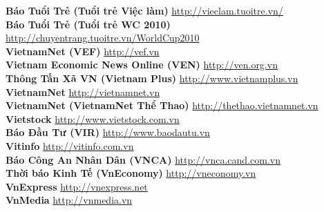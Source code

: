 \textbf{Báo Tuổi Trẻ (Tuổi trẻ Việc làm)} \hspace{0.5in} \href{http://vieclam.tuoitre.vn/}{http://vieclam.tuoitre.vn/} \\ 
\textbf{Báo Tuổi Trẻ (Tuổi trẻ WC 2010)} \hspace{0.5in} \href{http://chuyentrang.tuoitre.vn/WorldCup2010}{http://chuyentrang.tuoitre.vn/WorldCup2010} \\ 
\textbf{VietnamNet (VEF)}  \hspace{0.5in} \href{http://vef.vn}{http://vef.vn} \\ 
\textbf{Vietnam Economic News Online (VEN)}  \hspace{0.5in} \href{http://ven.org.vn}{http://ven.org.vn} \\ 
\textbf{Thông Tấn Xã VN (Vietnam Plus)}  \hspace{0.5in} \href{http://www.vietnamplus.vn}{http://www.vietnamplus.vn} \\ 
\textbf{VietnamNet}  \hspace{0.5in} \href{http://vietnamnet.vn}{http://vietnamnet.vn} \\ 
\textbf{VietnamNet (VietnamNet Thể Thao)} \hspace{0.5in} \href{http://thethao.vietnamnet.vn}{http://thethao.vietnamnet.vn} \\ 
\textbf{Vietstock}  \hspace{0.5in} \href{http://www.vietstock.com.vn}{http://www.vietstock.com.vn} \\ 
\textbf{Báo Đầu Tư (VIR)}  \hspace{0.5in} \href{http://www.baodautu.vn}{http://www.baodautu.vn} \\ 
\textbf{Vitinfo}  \hspace{0.5in} \href{http://vitinfo.com.vn}{http://vitinfo.com.vn} \\ 
\textbf{Báo Công An Nhân Dân (VNCA)}  \hspace{0.5in} \href{http://vnca.cand.com.vn}{http://vnca.cand.com.vn} \\ 
\textbf{Thời báo Kinh Tế (VnEconomy)}  \hspace{0.5in} \href{http://vneconomy.vn}{http://vneconomy.vn} \\ 
\textbf{VnExpress}  \hspace{0.5in} \href{http://vnexpress.net}{http://vnexpress.net} \\ 
\textbf{VnMedia}  \hspace{0.5in} \href{http://vnmedia.vn}{http://vnmedia.vn} \\ 
